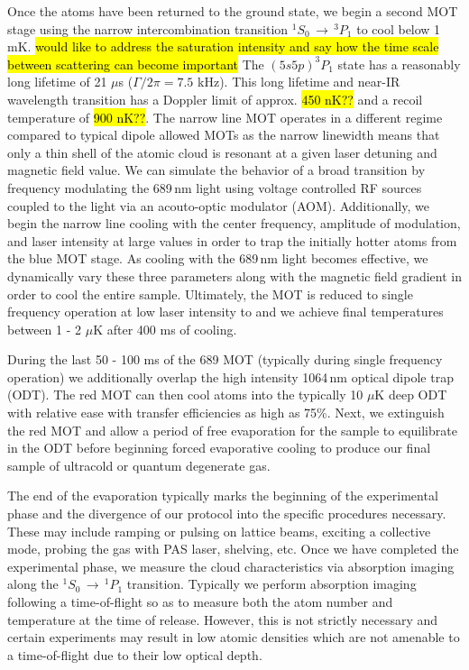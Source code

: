 Once the atoms have been returned to the ground state, we begin a second MOT stage using the narrow intercombination transition $^1S_0\,\rightarrow\,^3P_1$ to cool below 1 mK.
\hl{would like to address the saturation intensity and say how the time scale between scattering can become important}
The $(5s5p)^3P_1$ state has a reasonably long lifetime of 21 $\mu$s ($\Gamma/2\pi=7.5$ kHz).
This long lifetime and near-IR wavelength transition has a Doppler limit of approx. \hl{450 nK??} and a recoil temperature of \hl{900 nK??}.
The narrow line MOT operates in a different regime compared to typical dipole allowed MOTs as the narrow linewidth means that only a thin shell of the atomic cloud is resonant at a given laser detuning and magnetic field value.
We can simulate the behavior of a broad transition by frequency modulating the 689\,nm light using voltage controlled RF sources coupled to the light via an acouto-optic modulator (AOM). 
Additionally, we begin the narrow line cooling with the center frequency, amplitude of modulation, and laser intensity at large values in order to trap the initially hotter atoms from the blue MOT stage. 
As cooling with the 689\,nm light becomes effective, we dynamically vary these three parameters along with the magnetic field gradient in order to cool the entire sample.
Ultimately, the MOT is reduced to single frequency operation at low laser intensity to and we achieve final temperatures between 1 - 2 $\mu$K after 400 ms of cooling.

During the last 50 - 100 ms of the 689 MOT (typically during single frequency operation) we additionally overlap the high intensity 1064\,nm optical dipole trap (ODT).
The red MOT can then cool atoms into the typically 10 $\mu$K deep ODT with relative ease with transfer efficiencies as high as 75\%. 
Next, we extinguish the red MOT and allow a period of free evaporation for the sample to equilibrate in the ODT before beginning forced evaporative cooling to produce our final sample of ultracold or quantum degenerate gas.

The end of the evaporation typically marks the beginning of the experimental phase and the divergence of our protocol into the specific procedures necessary. 
These may include ramping or pulsing on lattice beams, exciting a collective mode, probing the gas with PAS laser, shelving, etc. 
Once we have completed the experimental phase, we measure the cloud characteristics via absorption imaging along the $^1S_0\,\rightarrow\,^1P_1$ transition. 
Typically we perform absorption imaging following a time-of-flight so as to measure both the atom number and temperature at the time of release. 
However, this is not strictly necessary and certain experiments may result in low atomic densities which are not amenable to a time-of-flight due to their low optical depth.


